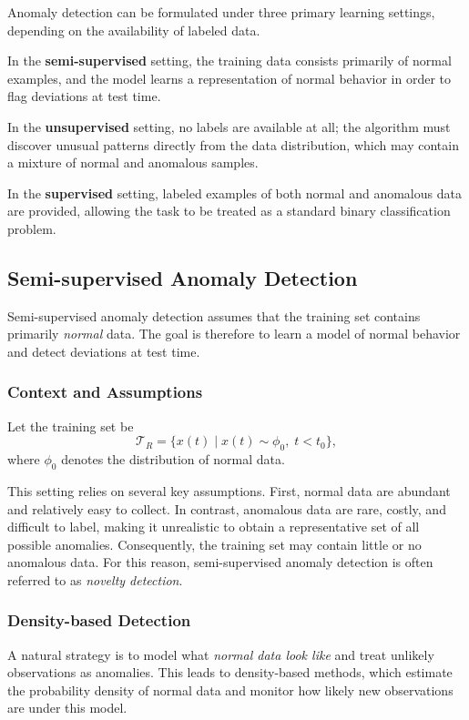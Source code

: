 \documentclass{article}
\begin{document}
Anomaly detection can be formulated under three primary learning settings,
depending on the availability of labeled data. 

In the \textbf{semi-supervised}
setting, the training data consists primarily of normal examples, and the model
learns a representation of normal behavior in order to flag deviations at test
time. 

In the \textbf{unsupervised} setting, no labels are available at all; the
algorithm must discover unusual patterns directly from the data distribution,
which may contain a mixture of normal and anomalous samples. 

In the \textbf{supervised} setting, labeled examples of both normal and anomalous data
are provided, allowing the task to be treated as a standard binary classification problem.

\subsection{Semi-supervised Anomaly Detection}

Semi-supervised anomaly detection assumes that the training set contains
primarily \emph{normal} data. The goal is therefore to learn a model of normal
behavior and detect deviations at test time.

\subsubsection{Context and Assumptions}

Let the training set be
\[
\mathcal{T}_R = \{x(t)\mid x(t)\sim \phi_0,\; t < t_0\},
\]
where $\phi_0$ denotes the distribution of normal data.

This setting relies on several key assumptions. First, normal data are abundant
and relatively easy to collect. In contrast, anomalous data are rare, costly,
and difficult to label, making it unrealistic to obtain a representative set of
all possible anomalies. Consequently, the training set may contain little or no
anomalous data. For this reason, semi-supervised anomaly detection is often
referred to as \emph{novelty detection}.

\subsubsection{Density-based Detection}

A natural strategy is to model what \emph{normal data look like} and treat
unlikely observations as anomalies. This leads to density-based methods, which
estimate the probability density of normal data and monitor how likely new
observations are under this model.
\end{document}
